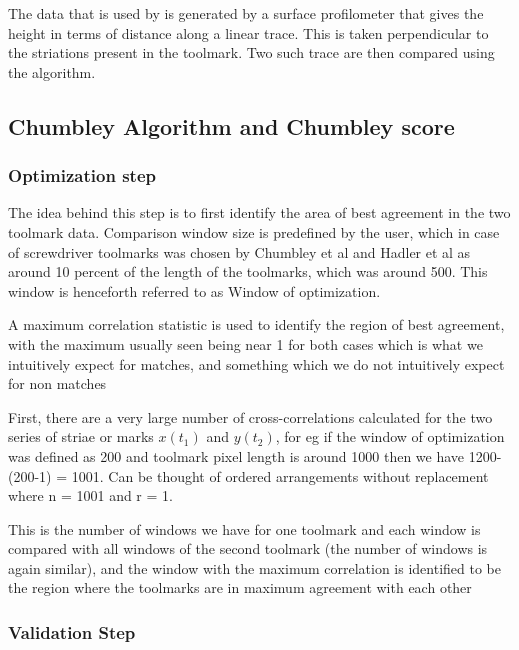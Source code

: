 \documentclass[12pt]{article}
\begin{document}
The data that is used by \citet{chumbley} is generated by a surface
profilometer that gives the height in terms of distance along a linear
trace. This is taken perpendicular to the striations present in the
toolmark. Two such trace are then compared using the algorithm.

\subsection{Chumbley Algorithm and Chumbley
score}\label{chumbley-algorithm-and-chumbley-score}

\subsubsection{Optimization step}\label{optimization-step}

The idea behind this step is to first identify the area of best
agreement in the two toolmark data. Comparison window size is predefined
by the user, which in case of screwdriver toolmarks was chosen by
Chumbley et al and Hadler et al as around 10 percent of the length of
the toolmarks, which was around 500. This window is henceforth referred
to as Window of optimization.

A maximum correlation statistic is used to identify the region of best
agreement, with the maximum usually seen being near 1 for both cases
which is what we intuitively expect for matches, and something which we
do not intuitively expect for non matches


First, there are a very large number of cross-correlations calculated
for the two series of striae or marks \(x(t_1)\) and \(y(t_2)\), for eg
if the window of optimization was defined as 200 and toolmark pixel
length is around 1000 then we have 1200-(200-1) = 1001. Can be thought
of ordered arrangements without replacement where n = 1001 and r = 1.

This is the number of windows we have for one toolmark and each window
is compared with all windows of the second toolmark (the number of
windows is again similar), and the window with the maximum correlation
is identified to be the region where the toolmarks are in maximum
agreement with each other

\subsubsection{Validation Step}\label{validation-step}
\end{document}
